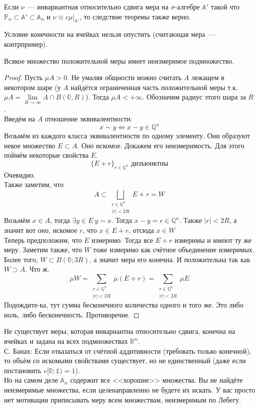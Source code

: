 \documentclass{article}
\begin{document}
    \begin{remark}
        Если $\nu$~--- инвариантная относительно сдвига мера на $\sigma$-алгебре $\mathbb A'$ такой что $\mathbb P_n\subset\mathbb A'\subset\mathbb A_n$ и $\nu\equiv c\mu\big|_{\mathbb A'}$, то следствие теоремы также верно.
    \end{remark}
    \begin{remark}
        Условие конечности на ячейках нельзя опустить (считающая мера~--- контрпример).
    \end{remark}
    \begin{theorem}
        Всякое множество положительной меры имеет неизмеримое подмножество.
    \end{theorem}
    \begin{proof}
        Пусть $\mu A>0$. Не умаляя общности можно считать $A$ лежащем в некотором шаре (у $A$ найдётся ограниченная часть положительной меры т.к. $\mu A=\lim\limits_{R\to\infty}A\cap B(\mathbb 0,R)$). Тогда $\mu A<+\infty$. Обозначим радиус этого шара за $R$.\\
        Введём на $A$ отношение эквивалентности:
        $$
        x\sim y\Leftrightarrow x-y\in\mathbb Q^n
        $$
        Возьмём из каждого класса эквивалентности по одному элементу. Они образуют некое множество $E\subset A$. Оно искомое. Докажем его неизмеримость. Для этого поймём некоторые свойства $E$.
        $$
        \{E+r\}_{r\in\mathbb Q^n}\text{ дизъюнктны}
        $$
        Очевидно.\\
        Также заметим, что
        $$
        A\subset\bigsqcup\limits_{\substack{r\in\mathbb Q^n\\|r|<2R}}E+r=W
        $$
        Возьмём $x\in A$, тогда $\exists y\in E~y\sim x$. Тогда $x-y=r\in\mathbb Q^n$. Также $|r|<2R$, а значит вот оно, искомое $r$, что $x\in E+r$, отсюда $x\in W$\\
        Теперь предположим, что $E$ измеримо. Тогда все $E+r$ измеримы и имеют ту же меру. Заметим также, что $W$ тоже измеримо как счётное объединение измеримых. Более того, $W\subset B(\mathbb 0;3R)$, а значит мера его конечна. И положительна так как $W\supset A$. Что ж.
        $$
        \mu W=\sum\limits_{\substack{r\in\mathbb Q^n\\|r|<2R}}\mu(E+r)=\sum\limits_{\substack{r\in\mathbb Q^n\\|r|<2R}}\mu E
        $$
        Подождите-ка, тут сумма бесконечного количества одного и того же. Это либо ноль, либо бесконечность. Противоречие.
    \end{proof}
    \begin{remark}
        Не существует меры, которая инвариантна относительно сдвига, конечна на ячейках и задана на всех подмножествах $\mathbb R^n$.\\
        С. Банах: Если отказаться от счётной аддитивности (требовать только конечной), то объём со искомыми свойствами существует, но не единственный (даже если постановить $v[\mathbb0;\mathbb1)=1$).\\
        Но на самом деле $\mathbb A_n$ содержит все <<хорошие>> множества. Вы не найдёте неизмеримые множества, если целенаправленно не будете их искать. У вас просто нет мотивации приписывать меру всем множествам, неизмеримым по Лебегу.
    \end{remark}
\end{document}
